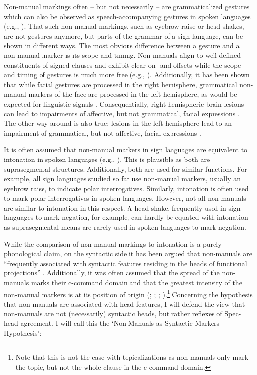 Non-manual markings often -- but not necessarily -- are grammaticalized gestures which can also be observed as speech-accompanying gestures in spoken languages (e.g., \citealt{wilcox2004gesture, pfau2006modality, pfau2011grammaticalization}). That such non-man\-u\-al markings, such as eyebrow raise or head shakes, are not gestures anymore, but parts of the grammar of a sign language, can be shown in different ways. The most obvious difference between a gesture and a non-manual marker is its scope and timing. Non-manuals align to well-defined constituents of signed clauses and exhibit clear on- and offsets while the scope and timing of gestures is much more free (e.g., \citealt{bakershenk1983, emmorey1999signers, wilbur2003modality}). Additionally, it has been shown that while facial gestures are processed in the right hemisphere, grammatical non-manual markers of the face are processed in the left hemisphere, as would be expected for linguistic signals \citep{corina1989recognition}. Consequentially, right hemispheric brain lesions can lead to impairments of affective, but not grammatical, facial expressions \citep{kegl1991interplay, poizner1992neural, loew1997fractionation, corina1999neuropsychological}. The other way around is also true: lesions in the left hemisphere lead to an impairment of grammatical, but not affective, facial expressions \citep{kegl1997crosslinguistic}.

It is often assumed that non-manual markers in sign languages are equivalent to intonation in spoken languages (e.g., \citealt{sandler1999prosody}). This is plausible as both are suprasegmental structures. Additionally, both are used for similar functions. For example, all sign languages studied so far use non-manual markers, usually an eyebrow raise, to indicate polar interrogatives. Similarly, intonation is often used to mark polar interrogatives in spoken languages. However, not all non-manuals are similar to intonation in this respect. A head shake, frequently used in sign languages to mark negation, for example, can hardly be equated with intonation as suprasegmental means are rarely used in spoken languages to mark negation.

While the comparison of non-manual markings to intonation is a purely phonological claim, on the syntactic side it has been argued that non-manuals are ``frequently associated with syntactic features residing in the heads of functional projections'' \citep[43]{neidle2000syntax}. Additionally, it was often assumed that the spread of the non-manuals marks their c-command domain and that the greatest intensity of the non-manual markers is at its position of origin (\citealt{bahan1996}; \citealt{petronio1997}; \citealt[43--45]{neidle2000syntax}; \citealt[311--312]{sandler2006sign}).\footnote{ Note that this is not the case with topicalizations as non-manuals only mark the topic, but not the whole clause in the c-command domain.} Concerning the hypothesis that non-manuals are associated with head features, I will defend the view that non-manuals are not (necessarily) syntactic heads, but rather reflexes of Spec-head agreement. I will call this the `Non-Manuals as Syntactic Markers Hypothesis':

